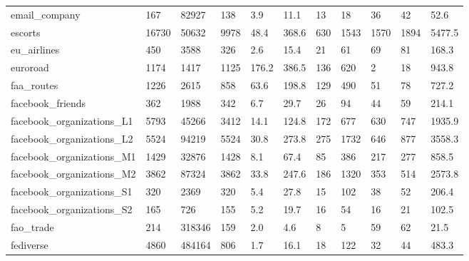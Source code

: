 \begin{longtable}{lllllllllll}
 email\_company                                      & 167        & 82927     & 138   & 3.9    & 11.1   & 13    & 18     & 36     & 42     & 52.6    \\
 escorts                                            & 16730      & 50632     & 9978  & 48.4   & 368.6  & 630   & 1543   & 1570   & 1894   & 5477.5  \\
 eu\_airlines                                        & 450        & 3588      & 326   & 2.6    & 15.4   & 21    & 61     & 69     & 81     & 168.3   \\
 euroroad                                           & 1174       & 1417      & 1125  & 176.2  & 386.5  & 136   & 620    & 2      & 18     & 943.8   \\
 faa\_routes                                         & 1226       & 2615      & 858   & 63.6   & 198.8  & 129   & 490    & 51     & 78     & 727.2   \\
 facebook\_friends                                   & 362        & 1988      & 342   & 6.7    & 29.7   & 26    & 94     & 44     & 59     & 214.1   \\
 facebook\_organizations\_L1                          & 5793       & 45266     & 3412  & 14.1   & 124.8  & 172   & 677    & 630    & 747    & 1935.9  \\
 facebook\_organizations\_L2                          & 5524       & 94219     & 5524  & 30.8   & 273.8  & 275   & 1732   & 646    & 877    & 3558.3  \\
 facebook\_organizations\_M1                          & 1429       & 32876     & 1428  & 8.1    & 67.4   & 85    & 386    & 217    & 277    & 858.5   \\
 facebook\_organizations\_M2                          & 3862       & 87324     & 3862  & 33.8   & 247.6  & 186   & 1320   & 353    & 514    & 2573.8  \\
 facebook\_organizations\_S1                          & 320        & 2369      & 320   & 5.4    & 27.8   & 15    & 102    & 38     & 52     & 206.4   \\
 facebook\_organizations\_S2                          & 165        & 726       & 155   & 5.2    & 19.7   & 16    & 54     & 16     & 21     & 102.5   \\
 fao\_trade                                          & 214        & 318346    & 159   & 2.0    & 4.6    & 8     & 5      & 59     & 62     & 21.5    \\
 fediverse                                          & 4860       & 484164    & 806   & 1.7    & 16.1   & 18    & 122    & 32     & 44     & 483.3   \\

\end{longtable}
